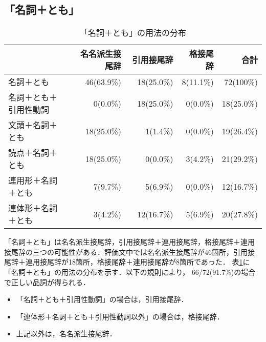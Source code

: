 \subsection{「名詞＋とも」}
\begin{table}
\begin{center}
\begin{tabular}{|l|r|r|r|r|} \hline
                       & 名名派生接尾辞 & 引用接尾辞　& 格接尾辞 & 合計 \\
\hline
名詞＋とも             & 46(63.9\%) & 18(25.0\%) & 8(11.1\%)& 72(100\%) \\
名詞＋とも＋引用性動詞 & 0(0.0\%)   & 18(25.0\%) & 0(0.0\%) & 18(25.0\%) \\
文頭＋名詞＋とも       & 18(25.0\%) &  1(1.4\%)  & 0(0.0\%) & 19(26.4\%) \\
読点＋名詞＋とも       & 18(25.0\%) &  0(0.0\%)  & 3(4.2\%) & 21(29.2\%) \\
連用形＋名詞＋とも     & 7(9.7\%)   &  5(6.9\%)  & 0(0.0\%) & 12(16.7\%) \\
連体形＋名詞＋とも     & 3(4.2\%)   & 12(16.7\%)  & 5(6.9\%) & 20(27.8\%) \\
\hline
\end{tabular}
\end{center}
\caption{「名詞＋とも」の用法の分布}
\label{tomo}
\end{table}

「名詞＋とも」は名名派生接尾辞，引用接尾辞＋連用接尾辞，格接尾辞＋連用
接尾辞の三つの可能性がある．評価文中では名名派生接尾辞が46箇所，引用接
尾辞＋連用接尾辞が18箇所，格接尾辞＋連用接尾辞が8箇所であった．
表\ref{tomo}に「名詞＋とも」の用法の分布を示す．以下の規則により，
66/72(91.7\%)の場合で正しい品詞が得られる．
\begin{itemize}
\item 「名詞＋とも＋引用性動詞」の場合は，引用接尾辞．
\item 「連体形＋名詞＋とも＋引用性動詞以外」の場合は，格接尾辞．
\item 上記以外は，名名派生接尾辞．
\end{itemize}



